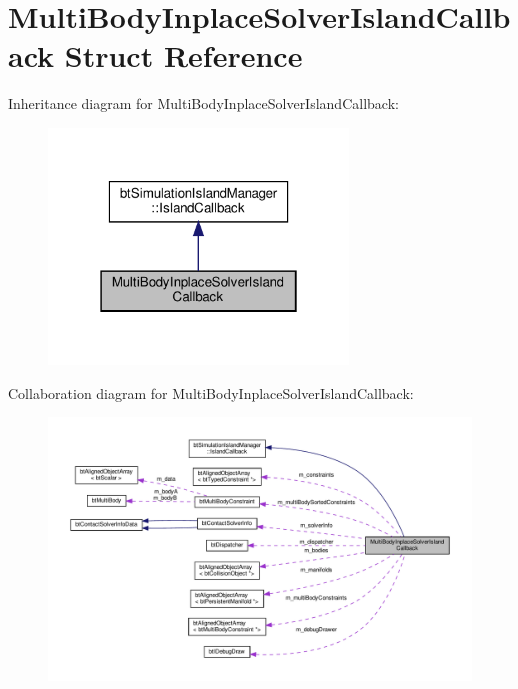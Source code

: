 \hypertarget{structMultiBodyInplaceSolverIslandCallback}{}\section{Multi\+Body\+Inplace\+Solver\+Island\+Callback Struct Reference}
\label{structMultiBodyInplaceSolverIslandCallback}


Inheritance diagram for Multi\+Body\+Inplace\+Solver\+Island\+Callback\+:
\nopagebreak
\begin{figure}[H]
\begin{center}
\leavevmode
\includegraphics[width=226pt]{structMultiBodyInplaceSolverIslandCallback__inherit__graph}
\end{center}
\end{figure}


Collaboration diagram for Multi\+Body\+Inplace\+Solver\+Island\+Callback\+:
\nopagebreak
\begin{figure}[H]
\begin{center}
\leavevmode
\includegraphics[width=350pt]{structMultiBodyInplaceSolverIslandCallback__coll__graph}
\end{center}
\end{figure}
